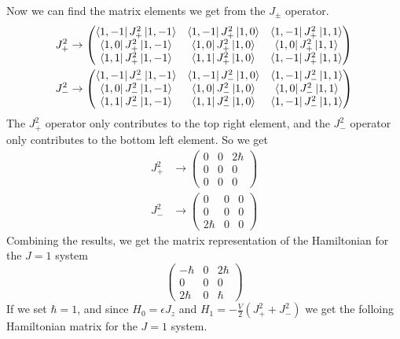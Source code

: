 \documentclass[11pt, letterpaper, titlepage]{article}
\begin{document}
Now we can find the matrix elements we get from the \(J_±\) operator.
\[
\begin{aligned}
        J_+^2 &\rightarrow
        \begin{pmatrix}
          \bra{1,-1} J_+ ^2 \ket{1,-1} & \bra{1,-1} J_+ ^2 \ket{1,0} & \bra{1,-1} J_+ ^2 \ket{1,1} \\
                \bra{1,0} J_+ ^2 \ket{1,-1} & \bra{1,0} J_+ ^2 \ket{1,0} & \bra{1,0} J_+ ^2 \ket{1,1} \\
                \bra{1,1} J_+ ^2 \ket{1,-1} & \bra{1,1} J_+ ^2 \ket{1,0} & \bra{1,-1} J_+ ^2 \ket{1,1}
        \end{pmatrix}\\
        J_-^2 &\rightarrow
        \begin{pmatrix}
                \bra{1,-1} J_- ^2 \ket{1,-1} & \bra{1,-1} J_- ^2 \ket{1,0} & \bra{1,-1} J_- ^2 \ket{1,1} \\
                \bra{1,0} J_- ^2 \ket{1,-1} & \bra{1,0} J_- ^2 \ket{1,0} & \bra{1,0} J_- ^2 \ket{1,1} \\
                \bra{1,1} J_- ^2 \ket{1,-1} & \bra{1,1} J_- ^2 \ket{1,0} & \bra{1,-1} J_- ^2 \ket{1,1}
        \end{pmatrix} 
\end{aligned}
\]
The \(J_+^2\) operator only contributes to the top right element, and the \(J_-^2\) operator only contributes to the bottom left element. So we get
\[
\begin{aligned}
        J_+^2 &\rightarrow
        \begin{pmatrix}
          0 & 0 & 2ℏ \\
          0 & 0 & 0 \\
          0 & 0 & 0
        \end{pmatrix} \\
        J_-^2 &\rightarrow
        \begin{pmatrix}
          0 & 0 & 0 \\
          0 & 0 & 0 \\
          2ℏ & 0 & 0
        \end{pmatrix}
\end{aligned}
\]
Combining the results, we get the matrix representation of the Hamiltonian for the \(J=1\) system
\[
\begin{pmatrix}
  -ℏ & 0 & 2ℏ \\
  0 & 0 & 0 \\
  2ℏ & 0 & ℏ
\end{pmatrix}
\]
If we set \(ℏ = 1\), and since \(H_0 = ϵJ_z\) and \(H_1 = -\frac{V}{2}(J_+ ^2 + J_-^2)\) we get the folloing Hamiltonian matrix for the \(J=1\) system. 
\end{document}
